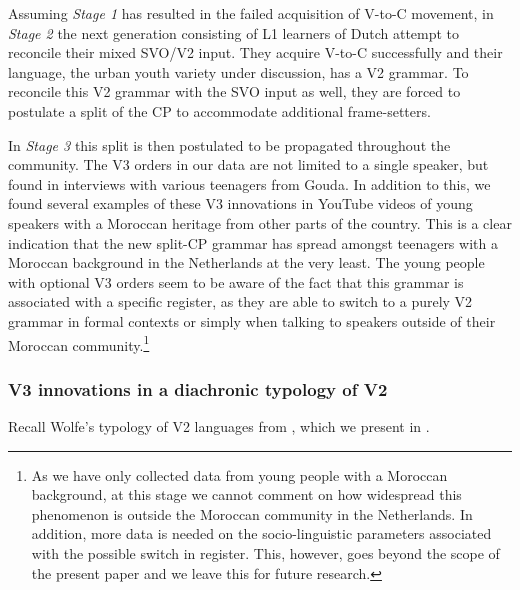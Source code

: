 \documentclass[output=paper]{langsci/langscibook}
\begin{document}
Assuming \textit{Stage 1} has resulted in the failed acquisition of V-to-C
movement, in \textit{Stage 2} the next generation consisting of L1 learners of
Dutch attempt to reconcile their mixed SVO/V2 input. They acquire V-to-C
successfully and their language, the urban youth variety under discussion, has
a V2 grammar. To reconcile this V2 grammar with the SVO input as well, they are
forced to postulate a split of the CP to accommodate additional frame-setters.

In \textit{Stage 3} this split is then postulated to be propagated throughout
the community. The V3 orders in our data are not limited to a
single speaker, but found in interviews with various teenagers from Gouda. In
addition to this, we found several examples of these V3
innovations in YouTube videos of young speakers with a Moroccan heritage from
other parts of the country. This is a clear indication that the new split-CP
grammar has spread amongst teenagers with a Moroccan background in the
Netherlands at the very least. The young people with optional V3 orders seem to be aware of the fact that this grammar is associated with
a specific register, as they are able to switch to a purely V2 grammar in
formal contexts or simply when talking to  speakers outside of their
Moroccan  community.\footnote{As we have only collected data from
    young people with a Moroccan background, at this stage we cannot comment on
    how widespread this phenomenon is outside the Moroccan community in the
Netherlands. In addition, more data is needed on the socio-linguistic
parameters associated with the possible switch in register. This, however, goes
beyond the scope of the present paper and we leave this for future research.}

\subsubsection{V3 innovations in a diachronic typology of V2}

Recall Wolfe's typology of V2 languages from , which we present in
.\largerpage[-2]
\end{document}
